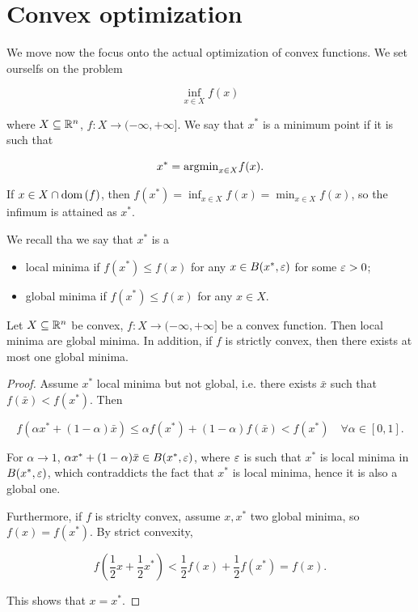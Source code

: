 \section{Convex optimization}

We move now the focus onto the actual optimization of convex functions. We set ourselfs on the problem 

\[ \inf_{x \in X} f(x) \]

where $X \subseteq {\mathbb{R}^n}$, $f : X \to (-\infty,+\infty]$. We say that $x^*$ is a minimum point if it is such that 

\[ x^* = \mathrm{argmin}_{x \in X} f(x). \]

If $x \in X \cap \mathrm{dom}\left(f\right)$, then $f(x^*) = \inf_{x \in X} f(x) = \min_{x \in X} f(x)$, so the infimum is attained as $x^*$.

We recall tha we say that $x^*$ is a 

\begin{itemize}
    \item local minima if $f(x^*) \le f(x)$ for any $x \in B(x^*,\varepsilon)$ for some $\varepsilon > 0$;
    \item global minima if $f(x^*) \le f(x)$ for any $x \in X$.
\end{itemize}

\begin{proposition}[Book 3.1.1]
    
    Let $X \subseteq {\mathbb{R}^n}$ be convex, $f : X \to (-\infty,+\infty]$ be a convex function. Then local minima are global minima. In addition, if $f$ is strictly convex, then there exists at most one global minima.

\end{proposition}

\begin{proof}
    
    Assume $x^*$ local minima but not global, i.e. there exists $\bar{x}$ such that $f(\bar{x}) < f(x^*)$. Then 

    \[ f(\alpha x^* + (1-\alpha)\bar{x}) \le \alpha f(x^*) + (1-\alpha)f(\bar{x}) < f(x^*) \quad \forall \alpha \in [0,1]. \]

    For $\alpha \to 1$, $\alpha x^* + (1-\alpha)\bar{x} \in B(x^*,\varepsilon)$, where $\varepsilon$ is such that $x^*$ is local minima in $B(x^*,\varepsilon)$, which contraddicts the fact that $x^*$ is local minima, hence it is also a global one.

    Furthermore, if $f$ is striclty convex, assume $x,x^*$ two global minima, so $f(x) = f(x^*)$. By strict convexity, 

    \[ f\left(\frac12 x + \frac12 x^*\right) < \frac12 f(x) + \frac12 f(x^*) = f(x). \]

    This shows that $x = x^*$.

\end{proof}

